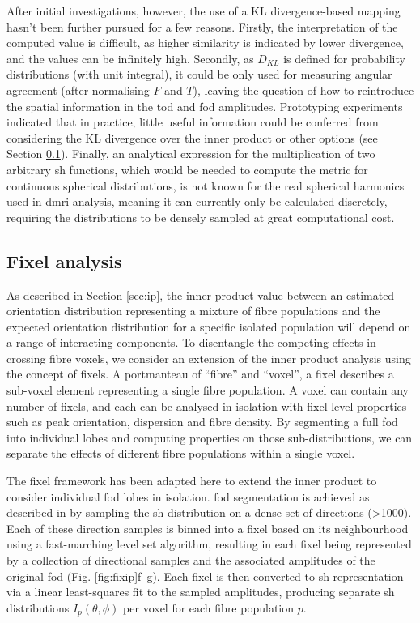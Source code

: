 \documentclass[12pt,phd,a4paper,twoside]{ucl_thesis}
\renewcommand{\textcite}[2][]{
\ifthenelse { \equal {#1} {} }  {\citeauthor{#2}\autocite{#2}}   {\citeauthor{#1}\autocite{#2}}}
\begin{document}
After initial investigations, however, the use of a KL divergence-based mapping hasn't been further pursued for a few reasons.
Firstly, the interpretation of the computed value is difficult, as higher similarity is indicated by lower divergence, and the values can be infinitely high.
Secondly, as $D_{KL}$ is defined for probability distributions (with unit integral), it could be only used for measuring angular agreement (after normalising $F$ and $T$), leaving the question of how to reintroduce the spatial information in the \gls{tod} and \gls{fod} amplitudes.
Prototyping experiments indicated that in practice, little useful information could be conferred from considering the KL  divergence over the inner product or other options (see Section \ref{sec:fixel}).
Finally, an analytical expression for the multiplication of two arbitrary \gls{sh} functions, which would be needed to compute the metric for continuous spherical distributions, is not known for the real spherical harmonics used in \gls{dmri} analysis, meaning it can currently only be calculated discretely, requiring the distributions to be densely sampled at great computational cost.

\subsection{Fixel analysis}\label{sec:fixel}

As described in Section \ref{sec:ip}, the inner product value between an estimated orientation distribution representing a mixture of fibre populations and the expected orientation distribution for a specific isolated population will depend on a range of interacting components.
To disentangle the competing effects in crossing fibre voxels, we consider an extension of the inner product analysis using the concept of fixels.
A portmanteau of ``fibre'' and ``voxel'', a fixel describes a sub-voxel element representing a single fibre population\autocite{Raffelt2015,Raffelt2017}.
A voxel can contain any number of fixels, and each can be analysed in isolation with fixel-level properties such as peak orientation, dispersion and fibre density.
By segmenting a full \gls{fod} into individual lobes and computing properties on those sub-distributions, we can separate the effects of different fibre populations within a single voxel.

The fixel framework has been adapted here to extend the inner product to consider individual \gls{fod} lobes in isolation.
\Gls{fod} segmentation is achieved as described in \textcite{Smith2013} by sampling the \gls{sh} distribution on a dense set of directions (\textgreater 1000).
Each of these direction samples is binned into a fixel based on its neighbourhood using a fast-marching level set algorithm, resulting in each fixel being represented by a collection of directional samples and the associated amplitudes of the original \gls{fod} (Fig. \ref{fig:fixip}f--g).
Each fixel is then converted to \gls{sh} representation via a linear least-squares fit to the sampled amplitudes, producing separate \gls{sh} distributions $I_p(\theta, \phi)$ per voxel for each fibre population $p$.
\end{document}

